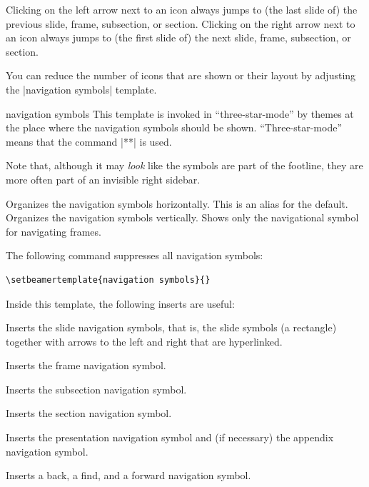 \endgroup

Clicking on the left arrow next to an icon always jumps to (the last slide of) the previous slide, frame, subsection, or section. Clicking on the right arrow next to an icon always jumps to (the first slide of) the next slide, frame, subsection, or section.

You can reduce the number of icons that are shown or their layout by adjusting the |navigation symbols| template.

\begin{element}{navigation symbols}\yes\yes\yes
  This template is invoked in ``three-star-mode'' by themes at the place where the navigation symbols should be shown. ``Three-star-mode'' means that the command |\usebeamertemplate***| is used.

  Note that, although it may \emph{look} like the symbols are part of the footline, they are more often part of an invisible right sidebar.

  \begin{templateoptions}
    Organizes the navigation symbols horizontally.
    This is an alias for the default.
    Organizes the navigation symbols vertically.
    Shows only the navigational symbol for navigating frames.
  \end{templateoptions}

  \example
  The following command suppresses all navigation symbols:
\begin{verbatim}
\setbeamertemplate{navigation symbols}{}
\end{verbatim}

  Inside this template, the following inserts are useful:
  \begin{itemize}
    \iteminsert{\insertslidenavigationsymbol}
    Inserts the slide navigation symbols, that is, the slide symbols (a rectangle) together with arrows to the left and right that are hyperlinked.

    \iteminsert{\insertframenavigationsymbol}
    Inserts the frame navigation symbol.

    \iteminsert{\insertsubsectionnavigationsymbol}
    Inserts the subsection navigation symbol.

    \iteminsert{\insertsectionnavigationsymbol}
    Inserts the section navigation symbol.

    \iteminsert{\insertdocnavigationsymbol}
    Inserts the presentation navigation symbol and (if necessary) the appendix navigation symbol.

    \iteminsert{\insertbackfindforwardnavigationsymbol}
    Inserts a back, a find, and a forward navigation symbol.
  \end{itemize}
\end{element}

